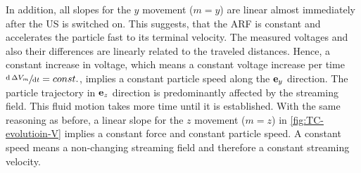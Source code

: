 In addition, all slopes for the $y$ movement ($m=y$) are linear almost 
immediately after the US is
switched on. This suggests, that the ARF is constant and accelerates the 
particle fast to its terminal velocity. The measured voltages and also their 
differences are linearly related to the traveled distances. Hence, a constant 
increase in voltage, which means a constant voltage increase per time 
$\sfrac{\text{d}\,\Delta V_{m}}{\text{d}t} = const.$, implies a constant particle 
speed along the $\vb{e}_{y}$ direction. The particle trajectory in $\vb{e}_{z}$ direction is 
predominantly affected by the streaming field. This fluid motion takes more 
time until it is established. With the same reasoning as before, a linear slope 
for the $z$ movement ($m=z$) in \cref{fig:TC-evolutioin-V} implies a constant 
force and constant particle speed. A constant speed means a non-changing 
streaming field and therefore a constant streaming velocity.

